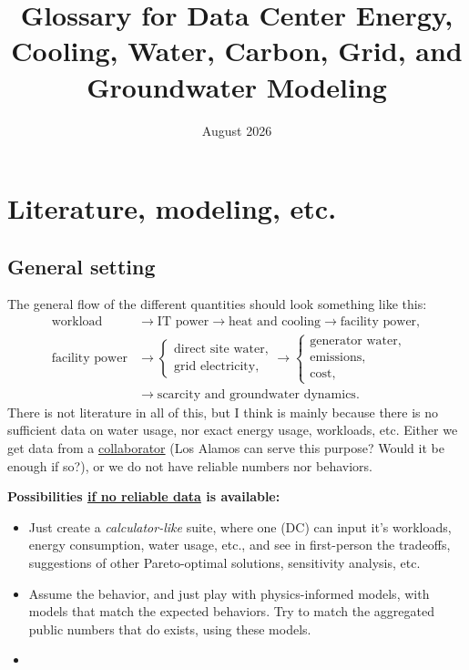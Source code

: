 \documentclass[10pt]{article}
\title{\textbf{Glossary for Data Center Energy, Cooling, Water, Carbon, Grid, and Groundwater Modeling}}
\author{}
\date{August 2026}
\begin{document}
\maketitle



\section{Literature, modeling, etc.}

\subsection{General setting}

The general flow of the different quantities should look something like this:
\[
\begin{aligned}
\text{workload}
&\rightarrow \text{IT power}
\rightarrow \text{heat and cooling}
\rightarrow \text{facility power},\\
\text{facility power}
&\rightarrow
\begin{cases}
\text{direct site water},\\
\text{grid electricity},
\end{cases}
\rightarrow
\begin{cases}
\text{generator water},\\
\text{emissions},\\
\text{cost},
\end{cases}\\
&\rightarrow \text{scarcity and groundwater dynamics}.
\end{aligned}
\]
There is not literature in all of this, but I think is mainly because there is no sufficient data on water usage, nor exact energy usage, workloads, etc. Either we get data from a \underline{collaborator} (Los Alamos can serve this purpose? Would it be enough if so?), or we do not have reliable numbers nor behaviors. 

\textbf{Possibilities \underline{if no reliable data} is available:}
\begin{itemize}
    \item Just create a \emph{calculator-like} suite, where one (DC) can input it's workloads, energy consumption, water usage, etc., and see in first-person the tradeoffs, suggestions of other Pareto-optimal solutions, sensitivity analysis, etc.
    \item Assume the behavior, and just play with physics-informed models, with models that match the expected behaviors. Try to match the aggregated public numbers that do exists, using these models.
    \item 
\end{itemize}
\end{document}
